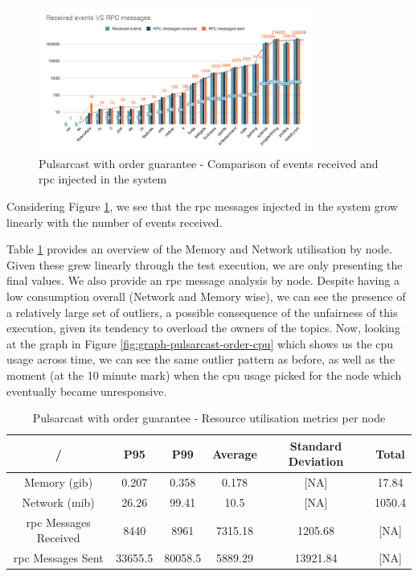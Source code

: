 \begin{figure}[!htb]
  \centering
  \includegraphics[width=0.8\textwidth]{img/graph-pulsarcast-order-rpc.png}
  \caption{Pulsarcast with order guarantee - Comparison of events received and \acrshort{rpc} injected in the system}
  \label{fig:graph-pulsarcast-order-rpc}
\end{figure}

Considering Figure \ref{fig:graph-pulsarcast-order-rpc}, we see that the
\acrshort{rpc} messages injected in the system grow linearly with the number of
events received.

Table \ref{table:pulsarcast-order} provides an overview of the Memory and
Network utilisation by node. Given these grew linearly through the test
execution, we are only presenting the final values. We also provide an \acrshort{rpc}
message analysis by node. Despite having a low consumption overall (Network and
Memory wise), we can see the presence of a relatively large set of outliers, a
possible consequence of the unfairness of this execution, given its tendency to
overload the owners of the topics. Now, looking at the graph in Figure
\ref{fig:graph-pulsarcast-order-cpu} which shows us the \acrshort{cpu} usage across time,
we can see the same outlier pattern as before, as well as the moment (at the 10
minute mark) when the \acrshort{cpu} usage picked for the node which eventually became
unresponsive.

\begin{table}[!htb]
\caption{Pulsarcast with order guarantee - Resource utilisation metrics per node}
\label{table:pulsarcast-order}
  \begin{center}
   \begin{tabular}{|c| c c c c c|} 
   \hline
   / & P95 & P99 & Average & Standard Deviation & Total \\ [0.5ex] 
   \hline\hline
   Memory (\acrshort{gib}) & 0.207 & 0.358 & 0.178 & [NA] & 17.84 \\
   \hline
   Network (\acrshort{mib}) & 26.26 & 99.41 & 10.5 & [NA] & 1050.4 \\
   \hline
   \acrshort{rpc} Messages Received & 8440 & 8961 & 7315.18 & 1205.68 & [NA] \\
   \hline
   \acrshort{rpc} Messages Sent & 33655.5 & 80058.5 & 5889.29 & 13921.84 & [NA] \\ [1ex] 
   \hline
  \end{tabular}
  \end{center}
\end{table}


